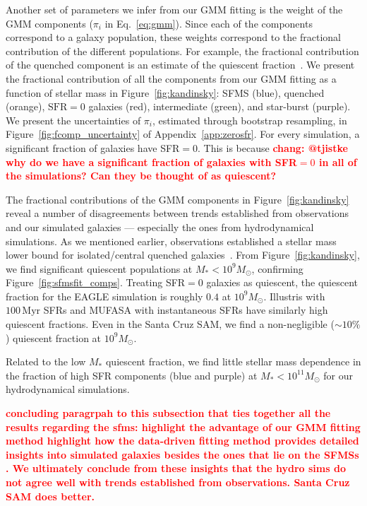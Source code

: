 \documentclass[preprint2,tighten]{aastex62}
\newcommand{\todo}[1]{{\bf \textcolor{red}{ #1}}}
\begin{document}
Another set of parameters we infer from our GMM fitting is the weight of the 
GMM components ($\pi_i$ in Eq.~\ref{eq:gmm}). Since each of the components 
correspond to a galaxy population, these weights correspond to the fractional
contribution of the different populations. For example, the fractional 
contribution of the quenched component is an estimate of the quiescent 
fraction~\citep[\emph{e.g.}][]{blanton2009, geha2012,hahn2015}. We present 
the fractional contribution of all the components from our GMM fitting as a
function of stellar mass in Figure~\ref{fig:kandinsky}: SFMS (blue), 
quenched (orange), $\mathrm{SFR}=0$ galaxies (red), intermediate (green), 
and star-burst (purple). We present the uncertainties of $\pi_i$, estimated
through bootstrap resampling, in Figure~\ref{fig:fcomp_uncertainty} of 
Appendix~\ref{app:zerosfr}. 
For every simulation, a significant fraction of galaxies have SFR$=0$. 
This is because \todo{chang: @tjistke why do we have a significant fraction 
of galaxies with SFR$=0$ in all of the simulations? Can they be thought
of as quiescent?} 

The fractional contributions of the GMM components in Figure~\ref{fig:kandinsky}
reveal a number of disagreements between trends established from 
observations and our simulated galaxies --- especially the ones from 
hydrodynamical simulations. As we mentioned earlier, observations 
established a stellar mass lower bound for isolated/central quenched
galaxies~\citep{geha2012}. From Figure~\ref{fig:kandinsky}, we find significant quiescent
populations at $M_* < 10^9 M_\odot$, confirming 
Figure~\ref{fig:sfmsfit_comps}. Treating SFR$=0$ galaxies as quiescent, the quiescent 
fraction for the EAGLE simulation is roughly $0.4$ at $10^9M_\odot$. 
Illustris with $100\,\mathrm{Myr}$ SFRs and MUFASA with instantaneous SFRs
have similarly high quiescent fractions. Even in the Santa Cruz SAM, we 
find a non-negligible ($\sim 10\%$) quiescent fraction at $10^9M_\odot$. 

Related to the low $M_*$ quiescent fraction, we find little stellar mass 
dependence in the fraction of high SFR components (blue and purple) at 
$M_* < 10^{11} M_\odot$ for our hydrodynamical simulations. 

\todo{concluding paragrpah to this subsection that ties together all the
results regarding the sfms: 
highlight the advantage of our GMM fitting method
highlight how the data-driven fitting method provides detailed insights into 
simulated galaxies besides the ones that lie on the SFMSs .
We ultimately conclude from these insights that the hydro sims do not agree
well with trends established from observations. Santa Cruz SAM does better.}
\end{document}
